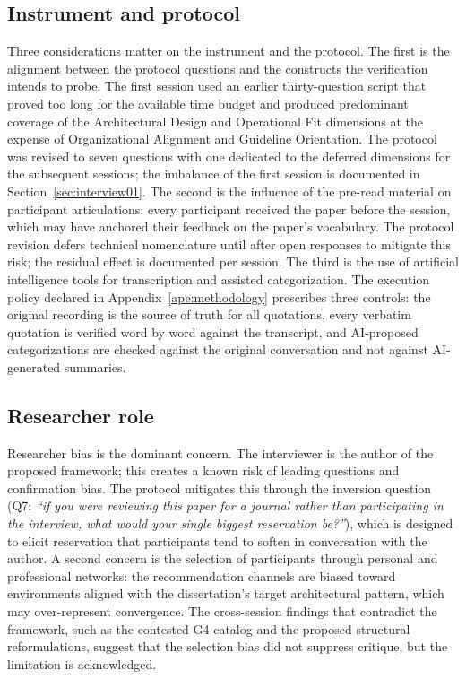 \subsection*{Instrument and protocol}

Three considerations matter on the instrument and the protocol. The first is the alignment between the protocol questions and the constructs the verification intends to probe. The first session used an earlier thirty-question script that proved too long for the available time budget and produced predominant coverage of the Architectural Design and Operational Fit dimensions at the expense of Organizational Alignment and Guideline Orientation. The protocol was revised to seven questions with one dedicated to the deferred dimensions for the subsequent sessions; the imbalance of the first session is documented in Section~\ref{sec:interview01}. The second is the influence of the pre-read material on participant articulations: every participant received the paper before the session, which may have anchored their feedback on the paper's vocabulary. The protocol revision defers technical nomenclature until after open responses to mitigate this risk; the residual effect is documented per session. The third is the use of artificial intelligence tools for transcription and assisted categorization. The execution policy declared in Appendix~\ref{ape:methodology} prescribes three controls: the original recording is the source of truth for all quotations, every verbatim quotation is verified word by word against the transcript, and AI-proposed categorizations are checked against the original conversation and not against AI-generated summaries.

\subsection*{Researcher role}

Researcher bias is the dominant concern. The interviewer is the author of the proposed framework; this creates a known risk of leading questions and confirmation bias. The protocol mitigates this through the inversion question (Q7: \emph{``if you were reviewing this paper for a journal rather than participating in the interview, what would your single biggest reservation be?''}), which is designed to elicit reservation that participants tend to soften in conversation with the author. A second concern is the selection of participants through personal and professional networks: the recommendation channels are biased toward environments aligned with the dissertation's target architectural pattern, which may over-represent convergence. The cross-session findings that contradict the framework, such as the contested G4 catalog and the proposed structural reformulations, suggest that the selection bias did not suppress critique, but the limitation is acknowledged.

